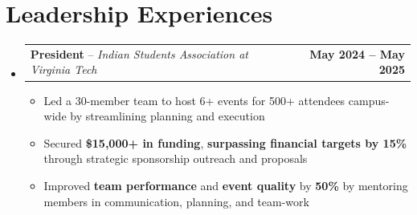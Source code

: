 \documentclass[letterpaper,11pt]{article}
\makeatletter
\newcommand{\resumeItem}[1]{
  \item\small{
    {#1 \vspace{-2pt}}
  }
}
\newcommand{\resumeSubheading}[4]{%
  \vspace{-2pt}\item
    \begin{tabular*}{1.0\textwidth}[t]{l@{\extracolsep{\fill}}r}
      \textbf{#1}{ -- }\textit{\small #3}%
      \ifthenelse{\equal{#4}{}}{}{, \textit{\small #4}}%
      & \textbf{\small #2} \\
    \end{tabular*}\vspace{-7pt}
}
\newcommand{\resumeSubHeadingListStart}{\begin{itemize}[leftmargin=0.0in, label={}]}
\newcommand{\resumeSubHeadingListEnd}{\end{itemize}}
\newcommand{\resumeItemListStart}{\begin{itemize}}
\newcommand{\resumeItemListEnd}{\end{itemize}\vspace{-5pt}}
\makeatother
\begin{document}
\section{Leadership Experiences}
    \resumeSubHeadingListStart
        \resumeSubheading
            {President}{May 2024 -- May 2025}
            {Indian Students Association at Virginia Tech}{Blacksburg, VA}
            \resumeItemListStart
                \resumeItem{Led a 30-member team to host 6+ events for 500+ attendees campus-wide by streamlining planning and execution}
                \resumeItem{Secured \textbf{\$15,000+ in funding}, \textbf{surpassing financial targets by 15\%} through strategic sponsorship outreach and proposals}
                \resumeItem{Improved \textbf{team performance} and \textbf{event quality} by \textbf{50\%} by mentoring members in communication, planning, and team-work}
            \resumeItemListEnd        
    \resumeSubHeadingListEnd

\end{document}
